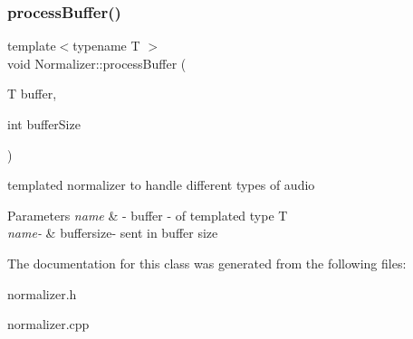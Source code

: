 \subsubsection{\texorpdfstring{process\+Buffer()}{processBuffer()}}
{\footnotesize\ttfamily template$<$typename T $>$ \\
void Normalizer\+::process\+Buffer (\begin{DoxyParamCaption}\item[{T}]{buffer,  }\item[{int}]{buffer\+Size }\end{DoxyParamCaption})\hspace{0.3cm}{\ttfamily [inline]}}

templated normalizer to handle different types of audio 
\begin{DoxyParams}{Parameters}
{\em name} & -\/ buffer -\/ of templated type T \\
\hline
{\em name-\/} & buffersize-\/ sent in buffer size \\
\hline
\end{DoxyParams}


The documentation for this class was generated from the following files\+:\begin{DoxyCompactItemize}
\item 
normalizer.\+h\item 
normalizer.\+cpp\end{DoxyCompactItemize}
